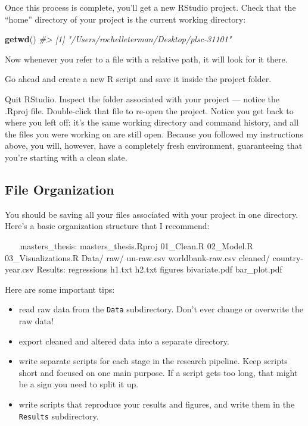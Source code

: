 \documentclass[]{book}
\newenvironment{Shaded}{\begin{snugshade}}{\end{snugshade}}
\newcommand{\KeywordTok}[1]{\textcolor[rgb]{0.13,0.29,0.53}{\textbf{#1}}}
\newcommand{\BaseNTok}[1]{\textcolor[rgb]{0.00,0.00,0.81}{#1}}
\newcommand{\CommentTok}[1]{\textcolor[rgb]{0.56,0.35,0.01}{\textit{#1}}}
\newcommand{\NormalTok}[1]{#1}
\providecommand{\tightlist}{%
  \setlength{\itemsep}{0pt}\setlength{\parskip}{0pt}}
\begin{document}
Once this process is complete, you'll get a new RStudio project. Check
that the ``home'' directory of your project is the current working
directory:

\begin{Shaded}
\begin{Highlighting}[]
\KeywordTok{getwd}\NormalTok{()}
\CommentTok{#> [1] "/Users/rochelleterman/Desktop/plsc-31101"}
\end{Highlighting}
\end{Shaded}

Now whenever you refer to a file with a relative path, it will look for
it there.

Go ahead and create a new R script and save it inside the project
folder.

Quit RStudio. Inspect the folder associated with your project --- notice
the .Rproj file. Double-click that file to re-open the project. Notice
you get back to where you left off: it's the same working directory and
command history, and all the files you were working on are still open.
Because you followed my instructions above, you will, however, have a
completely fresh environment, guaranteeing that you're starting with a
clean slate.

\subsection{File Organization}\label{file-organization}

You should be saving all your files associated with your project in one
directory. Here's a basic organization structure that I recommend:

\begin{Shaded}
\begin{Highlighting}[]
\NormalTok{~~~}
\NormalTok{masters_thesis:}
\NormalTok{  masters_thesis.Rproj}
\NormalTok{  01_Clean.R}
\NormalTok{  02_Model.R}
\NormalTok{  03_Visualizations.R}
\NormalTok{  Data/}
\BaseNTok{    raw/}
\BaseNTok{      un-raw.csv}
\BaseNTok{      worldbank-raw.csv}
\BaseNTok{    cleaned/}
\BaseNTok{      country-year.csv}
\NormalTok{  Results:}
\BaseNTok{    regressions}
\BaseNTok{      h1.txt}
\BaseNTok{      h2.txt}
\BaseNTok{    figures}
\BaseNTok{      bivariate.pdf}
\BaseNTok{      bar_plot.pdf}
\NormalTok{~~~}
\end{Highlighting}
\end{Shaded}

Here are some important tips:

\begin{itemize}
\tightlist
\item
  read raw data from the \texttt{Data} subdirectory. Don't ever change
  or overwrite the raw data!
\item
  export cleaned and altered data into a separate directory.
\item
  write separate scripts for each stage in the research pipeline. Keep
  scripts short and focused on one main purpose. If a script gets too
  long, that might be a sign you need to split it up.
\item
  write scripts that reproduce your results and figures, and write them
  in the \texttt{Results} subdirectory.
\end{itemize}
\end{document}
